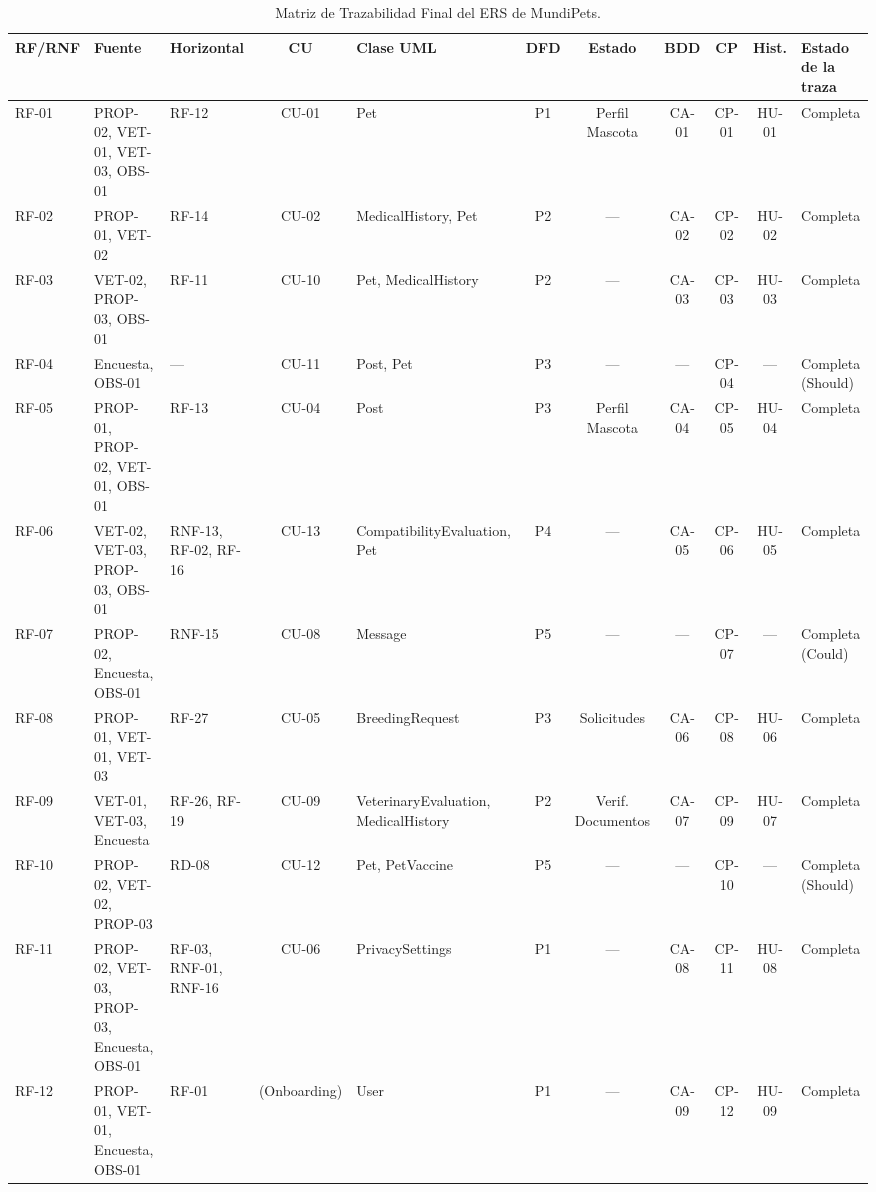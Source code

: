 \documentclass[journal,onecolumn]{IEEEtran}
\begin{document}
\begin{landscape}
	\begin{table}[H]
		\centering
		\caption{Matriz de Trazabilidad Final del ERS de MundiPets.}
		\label{tab:matriz_final}
		\tiny
		\begin{tabularx}{\linewidth}{|l|X|X|c|X|c|c|c|c|c|X|}
			\hline
			\textbf{RF/RNF} & \textbf{Fuente} & \textbf{Horizontal} & \textbf{CU} & \textbf{Clase UML} & \textbf{DFD} & \textbf{Estado} & \textbf{BDD} & \textbf{CP} & \textbf{Hist.} & \textbf{Estado de la traza} \\
			\hline
			RF-01 & PROP-02, VET-01, VET-03, OBS-01 & RF-12 & CU-01 & Pet & P1 & Perfil Mascota & CA-01 & CP-01 & HU-01 & Completa \\ \hline
			RF-02 & PROP-01, VET-02 & RF-14 & CU-02 & MedicalHistory, Pet & P2 & --- & CA-02 & CP-02 & HU-02 & Completa \\ \hline
			RF-03 & VET-02, PROP-03, OBS-01 & RF-11 & CU-10 & Pet, MedicalHistory & P2 & --- & CA-03 & CP-03 & HU-03 & Completa \\ \hline
			RF-04 & Encuesta, OBS-01 & --- & CU-11 & Post, Pet & P3 & --- & --- & CP-04 & --- & Completa (Should) \\ \hline
			RF-05 & PROP-01, PROP-02, VET-01, OBS-01 & RF-13 & CU-04 & Post & P3 & Perfil Mascota & CA-04 & CP-05 & HU-04 & Completa \\ \hline
			RF-06 & VET-02, VET-03, PROP-03, OBS-01 & RNF-13, RF-02, RF-16 & CU-13 & CompatibilityEvaluation, Pet & P4 & --- & CA-05 & CP-06 & HU-05 & Completa \\ \hline
			RF-07 & PROP-02, Encuesta, OBS-01 & RNF-15 & CU-08 & Message & P5 & --- & --- & CP-07 & --- & Completa (Could) \\ \hline
			RF-08 & PROP-01, VET-01, VET-03 & RF-27 & CU-05 & BreedingRequest & P3 & Solicitudes & CA-06 & CP-08 & HU-06 & Completa \\ \hline
			RF-09 & VET-01, VET-03, Encuesta & RF-26, RF-19 & CU-09 & VeterinaryEvaluation, MedicalHistory & P2 & Verif. Documentos & CA-07 & CP-09 & HU-07 & Completa \\ \hline
			RF-10 & PROP-02, VET-02, PROP-03 & RD-08 & CU-12 & Pet, PetVaccine & P5 & --- & --- & CP-10 & --- & Completa (Should) \\ \hline
			RF-11 & PROP-02, VET-03, PROP-03, Encuesta, OBS-01 & RF-03, RNF-01, RNF-16 & CU-06 & PrivacySettings & P1 & --- & CA-08 & CP-11 & HU-08 & Completa \\ \hline
			RF-12 & PROP-01, VET-01, Encuesta, OBS-01 & RF-01 & (Onboarding) & User & P1 & --- & CA-09 & CP-12 & HU-09 & Completa \\ \hline

\end{tabularx}
\end{table}
\end{landscape}
\end{document}
